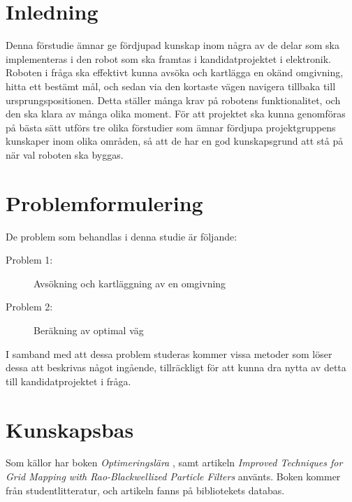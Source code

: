 \documentclass[12pt]{article}
\begin{document}
	\pagebreak
	
	\setcounter{secnumdepth}{3} %
	
	\tableofcontents	%
	
	\pagebreak
	
	
	
	\section{Inledning}
	Denna förstudie ämnar ge fördjupad kunskap inom några av de delar som ska implementeras i den robot som ska framtas i kandidatprojektet i elektronik. Roboten i fråga ska effektivt kunna avsöka och kartlägga en okänd omgivning, hitta ett bestämt mål, och sedan via den kortaste vägen navigera tillbaka till ursprungspositionen. Detta ställer många krav på robotens funktionalitet, och den ska klara av många olika moment. För att projektet ska kunna genomföras på bästa sätt utförs tre olika förstudier som ämnar fördjupa projektgruppens kunskaper inom olika områden, så att de har en god kunskapsgrund att stå på när val roboten ska byggas.\\[0.1in]
	
	\section{Problemformulering}
	\label{sec:problemform}
	De problem som behandlas i denna studie är följande:
	\begin{description}
	     \item[Problem 1:] Avsökning och kartläggning av en omgivning
	     \item[Problem 2:] Beräkning av optimal väg
	\end{description}
	I samband med att dessa problem studeras kommer vissa metoder som löser dessa att beskrivas något ingående, tillräckligt för att kunna dra nytta av detta till kandidatprojektet i fråga.\\[0.1in]
	
	\section{Kunskapsbas}
	Som källor har boken \textit{Optimeringslära} \autocite{lund-03}, samt artikeln \textit{Improved Techniques for Grid Mapping with Rao-Blackwellized Particle Filters} \autocite{gris-07} använts. Boken kommer från studentlitteratur, och artikeln fanns på bibliotekets databas.%
	
\end{document}
